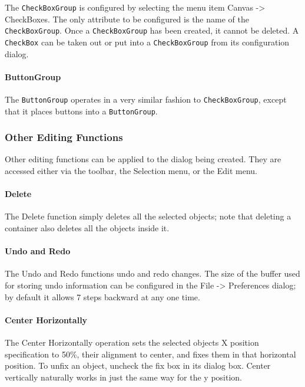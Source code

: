 The \texttt{CheckBoxGroup} is configured by selecting the menu
item Canvas -{\textgreater} CheckBoxes. The only attribute to
be configured is the name of the \texttt{CheckBoxGroup}. Once
a \texttt{CheckBoxGroup} has been created, it cannot be deleted. A
\texttt{CheckBox} can be taken out or put into a \texttt{CheckBoxGroup}
from its configuration dialog.

\paragraph{ButtonGroup}
The \texttt{ButtonGroup} operates in a very similar fashion to
\texttt{CheckBoxGroup}, except that it places buttons into a
\texttt{ButtonGroup}.

\subsubsection{Other Editing Functions}

Other editing functions can be applied to
the dialog being created. They are accessed either via the toolbar,
the Selection menu, or the Edit menu.

\paragraph{Delete}
The Delete function simply deletes all the selected objects; note that
deleting a container also deletes all the objects inside it.

\paragraph{Undo and Redo}
The Undo and Redo functions undo and redo changes. The size of the
buffer used for storing undo information can be configured in the File
-{\textgreater} Preferences dialog; by default it allows 7 steps
backward at any one time.

\paragraph[Center Horizontally]{Center Horizontally}
The Center Horizontally operation sets the selected
objects{\textquotesingle} X position specification to
{\textquotedbl}50\%{\textquotedbl}, their alignment to center, and
fixes them in that horizontal position. To
{\textquotedbl}unfix{\textquotedbl} an object, uncheck the
{\textquotedbl}fix{\textquotedbl} box in its dialog box. Center
vertically naturally works in just the same way for the y position.

